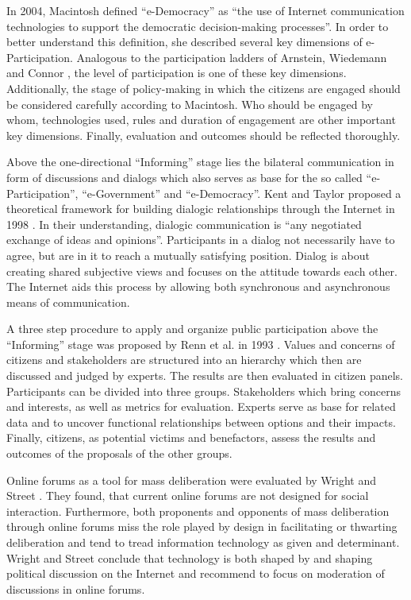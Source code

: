In 2004, Macintosh \cite{Macintosh2004_eParticipation_characterization} defined ``e-Democracy'' as ``the use of Internet communication technologies to support the democratic decision-making processes''. In order to better understand this definition, she described several key dimensions of e-Participation. Analogous to the participation ladders of Arnstein, Wiedemann and Connor \cite{Arnstein1969_citizen_participation,Wiedemann1993355,Connor1988_new_ladder}, the level of participation is one of these key dimensions. Additionally, the stage of policy-making in which the citizens are engaged should be considered carefully according to Macintosh. Who should be engaged by whom, technologies used, rules and duration of engagement are other important key dimensions. Finally, evaluation and outcomes should be reflected thoroughly.

Above the one-directional ``Informing'' stage lies the bilateral communication in form of discussions and dialogs which also serves as base for the so called ``e-Participation'', ``e-Government'' and ``e-Democracy''. Kent and Taylor proposed a theoretical framework for building dialogic relationships through the Internet in 1998 \cite{Kent1998_dialogic_relationships_through_www}. In their understanding, dialogic communication is ``any negotiated exchange of ideas and opinions''. Participants in a dialog not necessarily have to agree, but are in it to reach a mutually satisfying position. Dialog is about creating shared subjective views and focuses on the attitude towards each other. The Internet aids this process by allowing both synchronous and asynchronous means of communication.

A three step procedure to apply and organize public participation above the ``Informing'' stage was proposed by Renn et al. in 1993 \cite{Renn1993_participation}. Values and concerns of citizens and stakeholders are structured into an hierarchy which then are discussed and judged by experts. The results are then evaluated in citizen panels. Participants can be divided into three groups. Stakeholders which bring concerns and interests, as well as metrics for evaluation. Experts serve as base for related data and to uncover functional relationships between options and their impacts. Finally, citizens, as potential victims and benefactors, assess the results and outcomes of the proposals of the other groups.

Online forums as a tool for mass deliberation were evaluated by Wright and Street \cite{Wright2007_deliberation_design}. They found, that current online forums are not designed for social interaction. Furthermore, both proponents and opponents of mass deliberation through online forums miss the role played by design in facilitating or thwarting deliberation and tend to tread information technology as given and determinant. Wright and Street conclude that technology is both shaped by and shaping political discussion on the Internet and recommend to focus on moderation of discussions in online forums.

